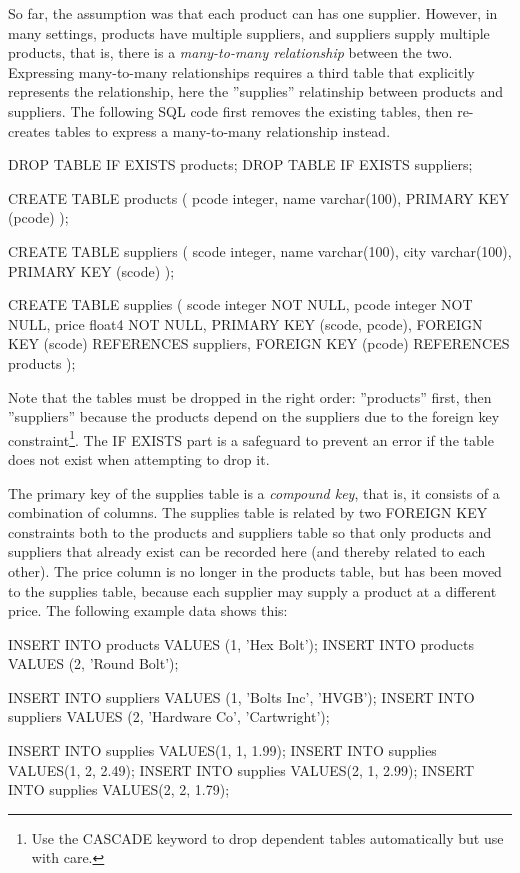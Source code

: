 So far, the assumption was that each product can has one supplier. However, in many settings, products have multiple suppliers, and suppliers supply multiple products, that is, there is a \emph{many-to-many relationship} between the two. Expressing many-to-many relationships requires a third table that explicitly represents the relationship, here the ''supplies'' relatinship between products and suppliers. The following SQL code first removes the existing tables, then re-creates tables to express a many-to-many relationship instead.

\begin{sqlcode}
DROP TABLE IF EXISTS products;
DROP TABLE IF EXISTS suppliers;

CREATE TABLE products (
  pcode integer,
  name  varchar(100),
  PRIMARY KEY (pcode) );

CREATE TABLE suppliers (
  scode integer,
  name  varchar(100),
  city  varchar(100),
  PRIMARY KEY (scode) );
  
CREATE TABLE supplies (
  scode  integer NOT NULL,
  pcode  integer NOT NULL,
  price  float4 NOT NULL,
  PRIMARY KEY (scode, pcode),
  FOREIGN KEY (scode) REFERENCES suppliers,
  FOREIGN KEY (pcode) REFERENCES products );
\end{sqlcode}

Note that the tables must be dropped in the right order: ''products'' first, then ''suppliers'' because the products depend on the suppliers due to the foreign key constraint\footnote{Use the CASCADE keyword to drop dependent tables automatically but use with care.}. The IF EXISTS part is a safeguard to prevent an error if the table does not exist when attempting to drop it.

The primary key of the supplies table is a \emph{compound key}, that is, it consists of a combination of columns. The supplies table is related by two FOREIGN KEY constraints both to the products and suppliers table so that only products and suppliers that already exist can be recorded here (and thereby related to each other). The price column is no longer in the products table, but has been moved to the supplies table, because each supplier may supply a product at a different price. The following example data shows this:

\begin{sqlcode}
INSERT INTO products VALUES (1, 'Hex Bolt');
INSERT INTO products VALUES (2, 'Round Bolt');

INSERT INTO suppliers VALUES (1, 'Bolts Inc', 'HVGB');
INSERT INTO suppliers VALUES (2, 'Hardware Co', 'Cartwright');

INSERT INTO supplies VALUES(1, 1, 1.99);
INSERT INTO supplies VALUES(1, 2, 2.49);
INSERT INTO supplies VALUES(2, 1, 2.99);
INSERT INTO supplies VALUES(2, 2, 1.79);
\end{sqlcode}

